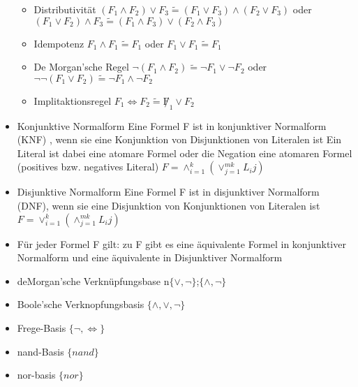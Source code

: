 \documentclass[10pt,a5paper]{article}
\begin{document}
\begin{itemize}
\begin{itemize}
\item Distributivität
\subitem \ensuremath{(F_1\land F_2)\lor F_3 \tilde{=}(F_1\lor F_3)\land(F_2\lor F_3) } oder \ensuremath{(F_1\lor F_2)\land F_3 \tilde{=}(F_1\land F_3)\lor(F_2\land F_3) }
\item Idempotenz
\subitem \ensuremath{F_1\land F_1\tilde{=}F_1} oder \ensuremath{F_1\lor F_1\tilde{=}F_1}
\item De Morgan'sche Regel
\subitem \ensuremath{\lnot (F_1\land F_2)\tilde{=}\lnot F_1\lor \lnot F_2} oder \ensuremath{\lnot\lnot (F_1\lor F_2)\tilde{=}\lnot F_1\land \lnot F_2}
\item Implitaktionsregel
\subitem \ensuremath{F_1\iff F_2\tilde{=}\not F_1\lor F_2}
\end{itemize}
\item Konjunktive Normalform
\subitem Eine Formel F ist in konjunktiver Normalform (KNF) , wenn sie eine Konjunktion von Disjunktionen von Literalen ist
\subitem Ein Literal ist dabei eine atomare Formel oder die Negation eine atomaren Formel (positives bzw. negatives Literal)
\subitem \ensuremath{F=\land^k_{i=1}(\lor^{mk}_{j=1}L_ij)}
\item Disjunktive Normalform
\subitem Eine Formel F ist in disjunktiver Normalform (DNF), wenn sie eine Disjunktion von Konjunktionen von Literalen ist
\subitem \ensuremath{F=\lor^k_{i=1}(\land^{mk}_{j=1}L_ij)}
\item Für jeder Formel F gilt:
\subitem zu F gibt es eine äquivalente Formel in konjunktiver Normalform und eine äquivalente in Disjunktiver Normalform
\item deMorgan'sche Verknüpfungsbase n\ensuremath{\{\lor,\lnot\}};\ensuremath{\{\land,\lnot\}}
\item Boole'sche Verknopfungsbasis \ensuremath{\{\land,\lor,\lnot\}}
\item Frege-Basis \ensuremath{\{\lnot, \iff\}}
\item nand-Basis \ensuremath{\{nand\}}
\item nor-basis \ensuremath{\{nor\}}
\end{itemize}
\end{document}
